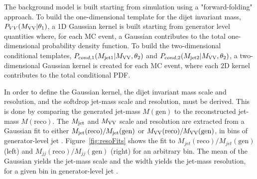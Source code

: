 \noindent The background model is built starting from simulation using a "forward-folding" approach. To build the one-dimensional template for the dijet invariant mass, $P_{VV}(M_{\rm VV}|\theta_1)$, a 1D Gaussian kernel is built starting from generator level quantities where, for each MC event, a Gaussian contributes to the total one-dimensional probability density function. To build the two-dimensional conditional templates, $P_{cond,1}(M_{\rm jet1}|M_{\rm VV},\theta_2) $ and $ P_{cond,2}(M_{\rm jet2}|M_{\rm VV},\theta_2)$, a two-dimensional Gaussian kernel is created for each MC event, where each 2D kernel contributes to the total conditional PDF.  \par
In order to define the Gaussian kernel, the dijet invariant mass scale and resolution, and the softdrop jet-mass scale and resolution, must be derived. 
This is done by comparing the generated jet-mass $M(\mathrm{gen})$ to the reconstructed jet-mass $M(\mathrm{reco})$. The $M_{\rm jet}$ and $M_{\rm VV}$ scale and resolution are extracted from a Gaussian fit to either $M_{\rm jet}(\mathrm{reco})/M_{\rm jet}(\mathrm{gen})$ or $M_{\rm VV}(\mathrm{reco})/M_{\rm VV}(\mathrm{gen})$, in bins of generator-level jet \PT. Figure~\ref{fig:resoFits} shows the fit to $M_{jet}(\mathrm{reco})/M_{jet}(\mathrm{gen})$ (left) and $M_{jj}(\mathrm{reco})/M_{jj}(\mathrm{gen})$ (right) for an arbitrary \PT bin. The mean of the Gaussian yields the jet-mass scale and the width yields the jet-mass resolution, for a given bin in generator-level jet \PT.
